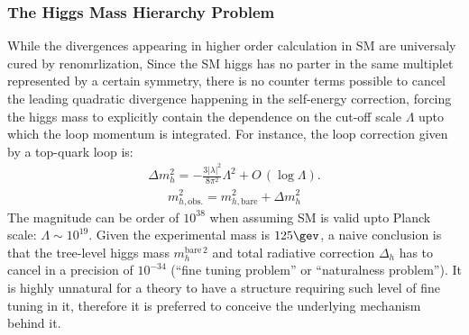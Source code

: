 \subsubsection{The Higgs Mass Hierarchy Problem} \label{sec::Introduction::homeworkSM::fineTuning}
While the divergences appearing in higher order calculation in SM are universaly cured by renomrlization, 
Since the SM higgs has no parter in the same multiplet represented by a certain symmetry, there is no counter terms possible to cancel the leading quadratic divergence happening in the self-energy correction, forcing the higgs mass to explicitly contain the dependence on the cut-off scale $\Lambda$ upto which the loop momentum is integrated.
For instance, the loop correction given by a top-quark loop is:
\begin{align}
\Delta m_h ^2 = - \frac{3|\lambda|^2}{8\pi^2} \Lambda^2 + O\,(\log\Lambda). 
\label{eq::naturalness1}
\end{align}
%
\begin{align}
m^2_{h,\mathrm{obs.}} = m^2_{h,\mathrm{bare}} + \Delta m_h ^2
\label{eq::naturalnessBare}
\end{align}
The magnitude can be order of $10^{38}$ when assuming SM is valid upto Planck scale: $\Lambda \sim 10^{19}$. 
Given the experimental mass is $125\gev$, a naive conclusion is that the tree-level higgs mass $m_h^{\mathrm{bare} \, 2}$ and total radiative correction $\Delta_h$ has to cancel in a precision of $10^{-34}$ (``fine tuning problem'' or ``naturalness problem'').
It is highly unnatural for a theory to have a structure requiring such level of fine tuning in it, therefore it is preferred to conceive the underlying mechanism behind it.  \\

